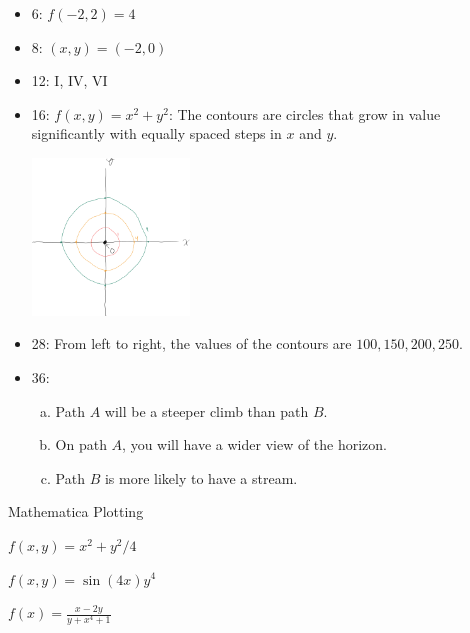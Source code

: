 \documentclass[9pt]{extarticle}
\begin{document}
  \begin{problem}{12.3}
    \begin{itemize}
      \item 6: $f(-2,2) = 4$
      \item 8: $(x,y) = (-2,0)$
      \item 12: I, IV, VI
      \item 16: $f(x,y) = x^2 + y^2$: The contours are circles that grow in value significantly with equally spaced steps in $x$ and $y$.
        \begin{center}
          \includegraphics[width=0.33\textwidth]{12_3_16}
        \end{center}
      \item 28: From left to right, the values of the contours are $100, 150, 200, 250$.
      \item 36:
        \begin{enumerate}[(a)]
          \item Path $A$ will be a steeper climb than path $B$.
          \item On path $A$, you will have a wider view of the horizon.
          \item Path $B$ is more likely to have a stream.
        \end{enumerate}
    \end{itemize}
  \end{problem}
  \begin{problem}{Mathematica Plotting}
    \begin{problem}{$f(x,y) = x^2 + y^2/4$}
      \begin{tcbraster}[raster columns = 1,colframe = black!75!white,colback=white]
      \end{tcbraster}
    \end{problem}
    \begin{problem}{$f(x,y) = \sin(4x)y^4$}
      \begin{tcbraster}[raster columns = 1,colframe = black!75!white,colback=white]
      \end{tcbraster}
    \end{problem}
    \begin{problem}{$f(x) = \frac{x-2y}{y+x^4+1}$}
      \begin{tcbraster}[raster columns = 1,colframe = black!75!white,colback=white]
      \end{tcbraster}
    \end{problem}
  \end{problem}
\end{document}
